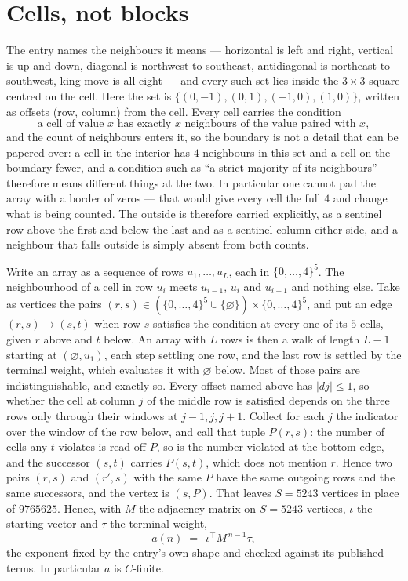 \documentclass[11pt,a4paper]{article}
\theoremstyle{plain}
\theoremstyle{definition}
\begin{document}
\section{Cells, not blocks}

The entry names the neighbours it means --- horizontal is left and right, vertical is up and
down, diagonal is northwest-to-southeast, antidiagonal is northeast-to-southwest, king-move is
all eight --- and every such set lies inside the $3\times3$ square centred on the cell. Here
the set is $\{(0,-1), (0,1), (-1,0), (1,0)\}$, written as offsets (row, column) from the cell. Every cell carries
the condition
\[
\text{a cell of value }x\text{ has exactly }x\text{ neighbours of the value paired with }x,
\]
and the count of neighbours enters it, so the boundary is not a detail that can be papered
over: a cell in the interior has $4$ neighbours in this set and a cell on the boundary
fewer, and a condition such as ``a strict majority of its neighbours'' therefore means
different things at the two. In particular one cannot pad the array with a border of zeros ---
that would give every cell the full $4$ and change what is being counted. The outside is
therefore carried
explicitly, as a sentinel row above the first and below the last and as a sentinel column
either side, and a neighbour that falls outside is simply absent from both counts.

Write an array as a sequence of rows $u_1,\dots,u_L$, each in
$\{0,\dots,4\}^{5}$. The neighbourhood of a cell in row $u_i$ meets $u_{i-1}$,
$u_i$ and $u_{i+1}$ and nothing else. Take as vertices the pairs
$(r,s)\in(\{0,\dots,4\}^{5}\cup\{\varnothing\})\times\{0,\dots,4\}^{5}$,
and put an edge $(r,s)\to(s,t)$ when row $s$ satisfies the condition at every one of its
$5$ cells, given $r$ above and $t$ below. An array with $L$ rows is then a walk of length
$L-1$ starting at $(\varnothing,u_1)$, each step settling one row, and the last row is
settled by the terminal weight, which evaluates it with $\varnothing$ below. Most of those pairs are indistinguishable, and exactly so. Every offset named above has $|dj|\le 1$, so whether the cell at column $j$ of the middle row is satisfied depends on the three rows only through their windows at $j-1,j,j+1$. Collect for each $j$ the indicator over the window of the row below, and call that tuple $P(r,s)$: the number of cells any $t$ violates is read off $P$, so is the number violated at the bottom edge, and the successor $(s,t)$ carries $P(s,t)$, which does not mention $r$. Hence two pairs $(r,s)$ and $(r',s)$ with the same $P$ have the same outgoing rows and the same successors, and the vertex is $(s,P)$. That leaves $S=5243$ vertices in place of $9765625$. Hence,
with $M$ the adjacency matrix on $S=5243$ vertices, $\iota$ the starting vector and $\tau$ the
terminal weight,
\[
a(n)\;=\;\,\iota^{\!\top}M^{\,n-1}\tau ,
\]
the exponent fixed by the entry's own shape and checked against its published terms. In
particular $a$ is $C$-finite.
\end{document}
